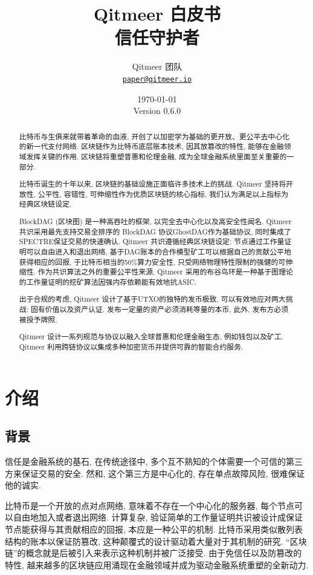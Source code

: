 \documentclass[a4paper,11pt]{article}
\title{\LARGE Qitmeer 白皮书\\
	\Large 信任守护者}
\author{
	Qitmeer 团队\\
		\small\href{mailto:paper@qitmeer.io}
			{\nolinkurl{paper@qitmeer.io}}
	}
\date{\today\\\small Version 0.6.0}
\newcommand{\watermark}[3]{\AddToShipoutPictureBG{
	\parbox[b][\paperheight]{\paperwidth}{
		\vfill%
		\centering%
	\tikz[remember picture, overlay]%
	  \node [rotate = #1, scale = #2] at (current page.center)%
	      {\textcolor{gray!80!cyan!30}{#3}};
	  \vfill}}}
\begin{document}
\clearpage
\pagestyle{plain}

\maketitle


\begin{abstract}
比特币\cite{bitcoin}与生俱来就带着革命的血液, 开创了以加密学为基础的更开放、更公平去中心化的新一代支付网络. 区块链作为比特币底层账本技术, 因其放篡改的特性, 能够在金融领域发挥关键的作用. 区块链将重塑普惠和伦理金融, 成为全球金融系统里面至关重要的一部分.

比特币诞生的十年以来, 区块链的基础设施正面临许多技术上的挑战. Qitmeer 坚持将开放性, 公平性, 容错性, 可伸缩性作为优质区块链的核心指标, 我们认为满足以上指标为经典区块链设定.

BlockDAG (区块图) 是一种高吞吐的框架, 以完全去中心化以及高安全性闻名. Qitmeer共识采用最先支持交易全排序的 BlockDAG 协议GhostDAG作为基础协议, 同时集成了SPECTRE保证交易的快速确认. Qitmeer 共识遵循经典区块链设定: 节点通过工作量证明可以自由进入和退出网络, 基于DAG账本的合作模型矿工可以根据自己的贡献公平地获得相应的回报, 于比特币相当的50\%算力安全性, 只受网络物理特性限制的强健的可伸缩性. 作为共识算法之外的重要公平性来源, Qitmeer 采用的布谷鸟环是一种基于图理论的工作量证明的挖矿算法因强内存依赖能有效地抗ASIC. 

出于合规的考虑, Qitmeer 设计了基于UTXO的独特的发币极致, 可以有效地应对两大挑战: 固有价值以及资产认证. 发布一定量的资产必须消耗等量的本币, 此外, 发布方必须被授予牌照.

Qitmeer 设计一系列规范与协议以融入全球普惠和伦理金融生态, 例如钱包以及矿工. Qitmeer 利用跨链协议以集成多种加密货币并提供可靠的智能合约服务.

\end{abstract}

\section{介绍}

\subsection{背景}

信任是金融系统的基石, 在传统途径中, 多个互不熟知的个体需要一个可信的第三方来保证交易的安全. 然和, 这个第三方是中心化的, 存在单点故障风险, 很难保证他的诚实.


比特币是一个开放的点对点网络, 意味着不存在一个中心化的服务器, 每个节点可以自由地加入或者退出网络. 计算复杂, 验证简单的工作量证明共识被设计成保证节点能获得与其贡献相应的回报, 本应是一种公平的机制. 比特币采用类似散列表结构的账本以保证防篡改, 这种颠覆式的设计驱动着大量对于其机制的研究. “区块链”的概念就是后被引入来表示这种机制并被广泛接受. 由于免信任以及防篡改的特性, 越来越多的区块链应用涌现在金融领域并成为驱动金融系统重塑的全新动力.
\end{document}
